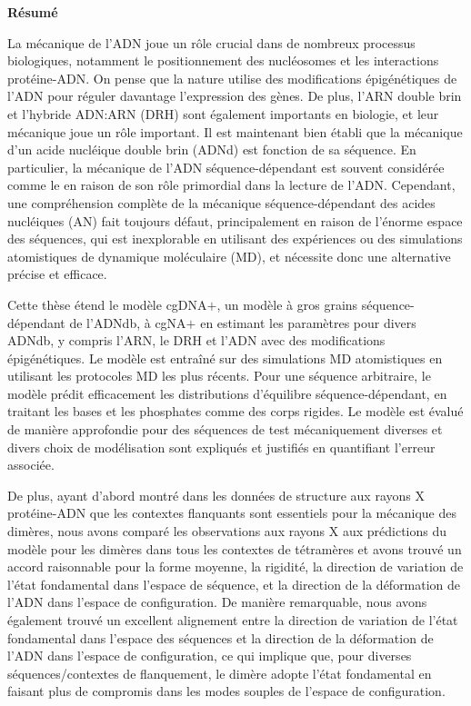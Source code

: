{\centerline {{\textbf{Résumé}}}}
\vspace{0.75cm}
La mécanique de l'ADN joue un rôle crucial dans de nombreux processus biologiques, notamment le positionnement des nucléosomes et les interactions protéine-ADN.
On pense que la nature utilise des modifications épigénétiques de l'ADN pour réguler davantage l'expression des gènes.
De plus, l'ARN double brin et l'hybride ADN:ARN (DRH) sont également importants en biologie, et leur mécanique joue un rôle important.
Il est maintenant bien établi que la mécanique d'un acide nucléique double brin (ADNd) est fonction de sa séquence.
En particulier, la mécanique de l'ADN séquence-dépendant est souvent considérée comme le  en raison de son rôle primordial dans la lecture de l'ADN.
Cependant, une compréhension complète de la mécanique séquence-dépendant des acides nucléiques (AN) fait toujours défaut, principalement en raison de l'énorme espace des séquences, qui est inexplorable en utilisant des expériences ou des simulations atomistiques de dynamique moléculaire (MD), et nécessite donc une alternative précise et efficace.


Cette thèse étend le modèle cgDNA$+$, un modèle à gros grains séquence-dépendant de l'ADNdb, à cgNA$+$ en estimant les paramètres pour divers ADNdb, y compris l'ARN, le DRH et l'ADN avec des modifications épigénétiques.
Le modèle est entraîné sur des simulations MD atomistiques en utilisant les protocoles MD les plus récents.
Pour une séquence arbitraire, le modèle prédit efficacement les distributions d'équilibre séquence-dépendant, en traitant les bases et les phosphates comme des corps rigides.
Le modèle est évalué de manière approfondie pour des séquences de test mécaniquement diverses et divers choix de modélisation sont expliqués et justifiés en quantifiant l'erreur associée.

De plus, ayant d'abord montré dans les données de structure aux rayons X protéine-ADN que les contextes flanquants sont essentiels pour la mécanique des dimères, nous avons comparé les observations aux rayons X aux prédictions du modèle pour les dimères dans tous les contextes de tétramères et avons trouvé un accord raisonnable pour la forme moyenne, la rigidité, la direction de variation de l'état fondamental dans l'espace de séquence, et la direction de la déformation de l'ADN dans l'espace de configuration.
De manière remarquable, nous avons également trouvé un excellent alignement entre la direction de variation de l'état fondamental dans l'espace des séquences et la direction de la déformation de l'ADN dans l'espace de configuration, ce qui implique que, pour diverses séquences/contextes de flanquement, le dimère adopte l'état fondamental en faisant plus de compromis dans les modes souples de l'espace de configuration.

